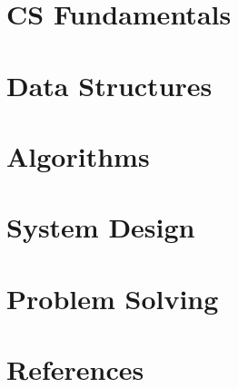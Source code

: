 \section[CS]{CS Fundamentals}
	
	
	
\section[DS]{Data Structures}
	
	
	
	
	
	
\section[Algos]{Algorithms}
		
	
	

\section[Sys]{System Design}

	
	

\section[Probs]{Problem Solving}
	


\section[Refs]{References}
	

